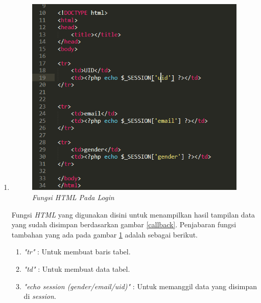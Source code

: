 \begin{enumerate}
\item
\begin{figure}[!htbp]
    \centering
    \includegraphics[scale=0.5]{gambar/loginhtml}
    \caption{\textit{Fungsi \textit{HTML} Pada \textit{Login}}}
    \label{loginhtml}
\end{figure}
\par 
Fungsi \textit{HTML} yang digunakan disini untuk menampilkan hasil tampilan data yang sudah disimpan berdasarkan gambar \ref{callback}. Penjabaran fungsi tambahan yang ada pada gambar \ref{loginhtml} adalah sebagai berikut.
\\
\begin{enumerate}
\item \textit{"tr"} : Untuk membuat baris tabel.
\item \textit{"td"} : Untuk membuat data tabel.
\item \textit{"echo session (gender/email/uid)"} : Untuk memanggil data yang disimpan di \textit{session}.
\end{enumerate}
\end{enumerate}


